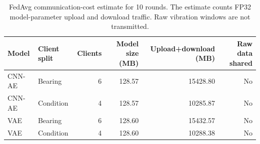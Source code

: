 \begin{table}[t]
\centering
\caption{FedAvg communication-cost estimate for 10 rounds. The estimate counts FP32 model-parameter upload and download traffic. Raw vibration windows are not transmitted.}
\label{tab:comm_cost}
\small
\begin{tabularx}{\textwidth}{lXrrrr}
\toprule
Model & Client split & Clients & Model size (MB) & Upload+download (MB) & Raw data shared \\
\midrule
CNN-AE & Bearing & 6 & 128.57 & 15428.80 & No \\
CNN-AE & Condition & 4 & 128.57 & 10285.87 & No \\
VAE & Bearing & 6 & 128.60 & 15432.57 & No \\
VAE & Condition & 4 & 128.60 & 10288.38 & No \\
\bottomrule
\end{tabularx}
\end{table}
